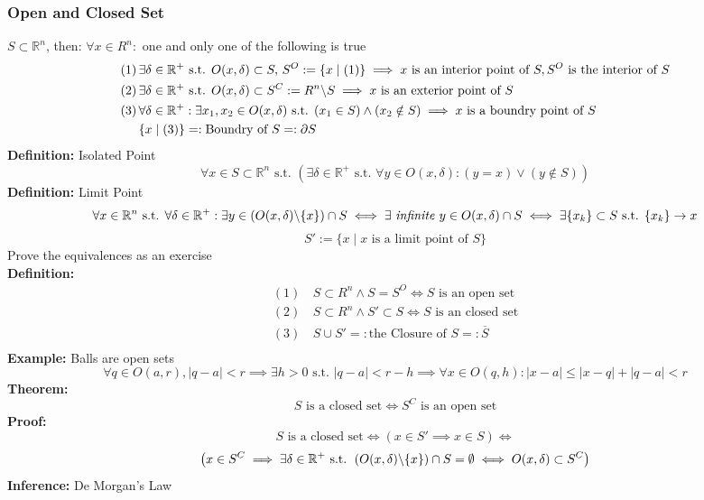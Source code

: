\documentclass{article}
\newcommand{\R}{\mathbb{R}}
\newcommand{\st}{\mbox{ s.t. }}
\newcommand{\0}{{\bf{0}}}
\begin{document}
\subsubsection{Open and Closed Set}
$S\subset\R^n$, then: $\forall x\in R^n:$ one and only one of the following is true
\begin{equation}
\begin{split}
    (1)\,&\exists\delta\in\R^+\st O(x,\delta)\subset S,\,S^O:=\{x\mid(1)\}\implies x\mbox{ is an interior point of }S, S^O\mbox{ is the interior of }S\\
    (2)\,&\exists\delta\in\R^+\st O(x,\delta)\subset S^C:=R^n\symbol{92}S\implies x\mbox{ is an exterior point of }S\\
    (3)\,&\forall\delta\in\R^+:\exists x_1,x_2\in O(x,\delta)\st (x_1\in S)\land(x_2\notin S)\implies x\mbox{ is a boundry point of }S\\
    &\{x\mid(3)\}=:\mbox{Boundry of }S=:\partial S
\end{split}
\end{equation}
\textbf{Definition:} Isolated Point
$$\forall x\in S\subset\R^n\st(\exists\delta\in\R^+\st\forall y\in O(x,\delta):(y=x)\lor(y\notin S))$$
\textbf{Definition:} Limit Point
$$\forall x\in\R^n\st\forall\delta\in\R^+:\exists y\in (O(x,\delta)\symbol{92}\{x\})\cap S\iff\exists \mbox{ \textit{infinite} }y\in O(x,\delta)\cap S\iff\exists\{x_k\}\subset S\st\{x_k\}\to x$$
$$S':=\{x\mid x\mbox{ is a limit point of }S\}$$
\null\hfill{Prove the equivalences as an exercise}\\
\textbf{Definition:}
\begin{equation}
\begin{split}
    (1)\,&S\subset R^n\land S=S^O\iff S\mbox{ is an open set}\\
    (2)\,&S\subset R^n\land S'\subset S\iff S\mbox{ is an closed set}\\
    (3)\,&S\cup S'=:\mbox{the Closure of }S=:\overline{S}\\
\end{split}
\end{equation}
\textbf{Example:} Balls are open sets
$$\forall q\in O(a,r),|q-a|<r\implies\exists h>0\st|q-a|<r-h\implies\forall x\in O(q,h):|x-a|\le|x-q|+|q-a|<r$$
\textbf{Theorem:}
$$S\mbox{ is a closed set}\iff S^C\mbox{ is an open set}$$
\textbf{Proof:}
$$S\mbox{ is a closed set}\iff\left(x\in S'\implies x\in S\right)\iff$$
$$\left(x\in S^C\implies\exists\delta\in\R^+\st 
\left(O(x,\delta)\symbol{92}\{x\}\right)\cap S=\emptyset\iff O(x,\delta)\subset S^C\right)$$
\textbf{Inference:} De Morgan's Law\\
\end{document}

